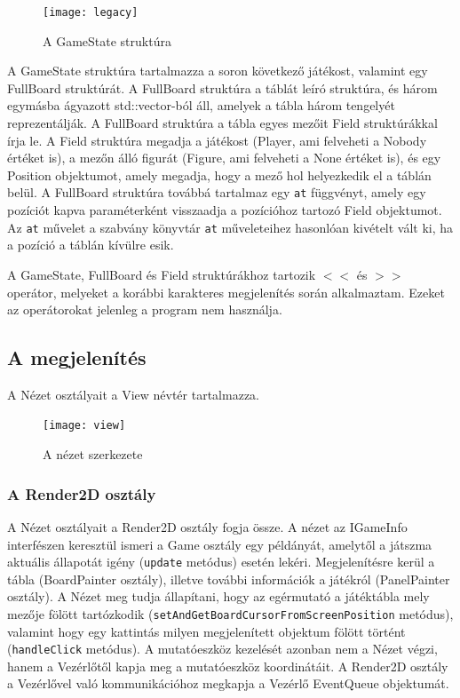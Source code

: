 \documentclass[12pt, twoside]{report}
\begin{document}
\begin{figure}[h]
	\begin{center}
		\texttt{[image: legacy]}
	\end{center}
	\caption{A GameState struktúra}
\end{figure}

A GameState struktúra tartalmazza a soron következő játékost, valamint egy FullBoard struktúrát. A FullBoard struktúra a táblát leíró struktúra, és három egymásba ágyazott std::vector-ból áll, amelyek a tábla három tengelyét reprezentálják. A FullBoard struktúra a tábla egyes mezőit Field struktúrákkal írja le. A Field struktúra megadja a játékost (Player, ami felveheti a Nobody értéket is), a mezőn álló figurát (Figure, ami felveheti a None értéket is), és egy Position objektumot, amely megadja, hogy a mező hol helyezkedik el a táblán belül. A FullBoard struktúra továbbá tartalmaz egy {\tt at} függvényt, amely egy pozíciót kapva paraméterként visszaadja a pozícióhoz tartozó Field objektumot. Az {\tt at} művelet a szabvány könyvtár {\tt at} műveleteihez hasonlóan kivételt vált ki, ha a pozíció a táblán kívülre esik.

A GameState, FullBoard és Field struktúrákhoz tartozik $<<$ és $>>$ operátor, melyeket a korábbi karakteres megjelenítés során alkalmaztam. Ezeket az operátorokat jelenleg a program nem használja.

\subsection{A megjelenítés}

A Nézet osztályait a View névtér tartalmazza.

\begin{figure}[h]
	\begin{center}
		\texttt{[image: view]}
	\end{center}
	\caption{A nézet szerkezete}
\end{figure}

\subsubsection{A Render2D osztály}

A Nézet osztályait a Render2D osztály fogja össze. A nézet az IGameInfo interfészen keresztül ismeri a Game osztály egy példányát, amelytől a játszma aktuális állapotát igény ({\tt update} metódus) esetén lekéri. Megjelenítésre kerül a tábla (BoardPainter osztály), illetve további információk a játékról (PanelPainter osztály). A Nézet meg tudja állapítani, hogy az egérmutató a játéktábla mely mezője fölött tartózkodik \break ({\tt setAndGetBoardCursorFromScreenPosition} metódus), valamint hogy egy kattintás milyen megjelenített objektum fölött történt ({\tt handleClick} metódus). A mutatóeszköz kezelését azonban nem a Nézet végzi, hanem a Vezérlőtől kapja meg a mutatóeszköz koordinátáit. A Render2D osztály a Vezérlővel való kommunikációhoz megkapja a Vezérlő EventQueue objektumát.
\end{document}
